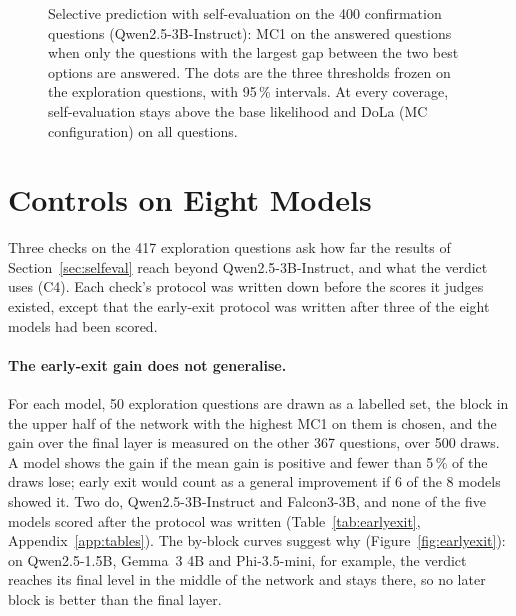 \documentclass[11pt]{article}
\newcommand{\cha}[1]{\textsf{C#1}}
\newcommand{\mainmodel}{Qwen2.5-3B-Instruct}
\begin{document}
\begin{figure}[t]
\centering

\caption{Selective prediction with self-evaluation on the 400 confirmation questions (\mainmodel{}): MC1 on the
answered questions when only the questions with the largest gap between the two best options are answered. The
dots are the three thresholds frozen on the exploration questions, with 95\,\% intervals. At every coverage,
self-evaluation stays above the base likelihood and DoLa (MC configuration) on all questions.}
\label{fig:riskcoverage}
\end{figure}

\begin{table}[t]
\centering\small\setlength{\tabcolsep}{4pt}
\caption{Selective prediction on the 400 confirmation questions with the thresholds frozen on the exploration
questions. Interval: 95\,\% bootstrap interval of MC1 on the answered questions.}
\label{tab:selective}
\end{table}

\section{Controls on Eight Models}
\label{sec:controls}

Three checks on the 417 exploration questions ask how far the results of Section~\ref{sec:selfeval} reach beyond
\mainmodel{}, and what the verdict uses (\cha4). Each check's protocol was written down before the scores it
judges existed, except that the early-exit protocol was written after three of the eight models had been scored.

\paragraph{The early-exit gain does not generalise.}
For each model, 50 exploration questions are drawn as a labelled set, the block in the upper half of the network
with the highest MC1 on them is chosen, and the gain over the final layer is measured on the other 367 questions,
over 500 draws. A model shows the gain if the mean gain is positive and fewer than 5\,\% of the draws lose; early exit
would count as a general improvement if 6 of the 8 models showed it. Two do, \mainmodel{} and Falcon3-3B, and none
of the five models scored after the protocol was written (Table~\ref{tab:earlyexit}, Appendix~\ref{app:tables}). The by-block curves suggest
why (Figure~\ref{fig:earlyexit}): on Qwen2.5-1.5B, Gemma~3 4B and Phi-3.5-mini, for example, the verdict reaches its
final level in the middle of the network and stays there, so no later block is better than the final layer.
\end{document}
